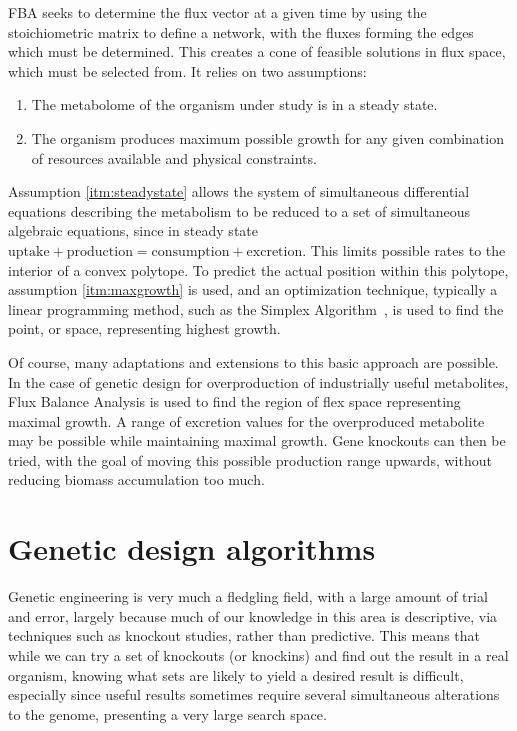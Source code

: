 FBA seeks to determine the flux vector at a given time by using the stoichiometric matrix to define a network, with the fluxes forming the edges which must be determined. 
This creates a cone of feasible solutions in flux space, which must be selected from. 
It relies on two assumptions:
\begin{enumerate}
\item \label{itm:steadystate} The metabolome of the organism under study is in a steady state.
\item \label{itm:maxgrowth} The organism produces maximum possible growth for any given combination of resources available and physical constraints.
\end{enumerate}
Assumption \ref{itm:steadystate} allows the system of simultaneous differential equations describing the metabolism to be reduced to a set of simultaneous algebraic equations, since in steady state \(\text{uptake} + \text{production} = \text{consumption} + \text{excretion}\). 
This limits possible rates to the interior of a convex polytope. 
To predict the actual position within this polytope, assumption \ref{itm:maxgrowth} is used, and an optimization technique, typically a linear programming method, such as the Simplex Algorithm~\cite{Dantzig1951}, is used to find the point, or space, representing highest growth.

Of course, many adaptations and extensions to this basic approach are possible. 
In the case of genetic design for overproduction of industrially useful metabolites, Flux Balance Analysis is used to find the region of flex space representing maximal growth. A range of excretion values for the overproduced metabolite may be possible while maintaining maximal growth. Gene knockouts can then be tried, with the goal of moving this possible production range upwards, without reducing biomass accumulation too much.

\section{Genetic design algorithms}
Genetic engineering is very much a fledgling field, with a large amount of trial and error, largely because much of our knowledge in this area is descriptive, via techniques such as knockout studies, rather than predictive. 
This means that while we can try a set of knockouts (or knockins) and find out the result in a real organism, knowing what sets are likely to yield a desired result is difficult, especially since useful results sometimes require several simultaneous alterations to the genome, presenting a very large search space.

